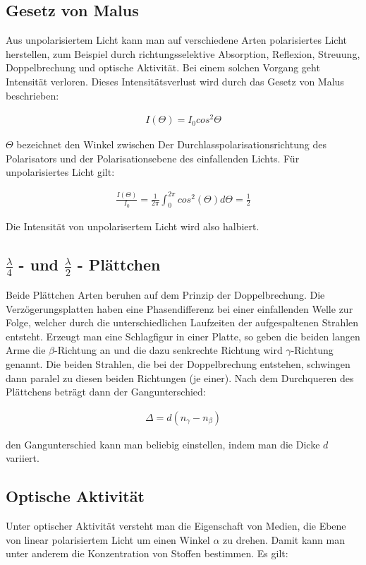 \documentclass[a4paper,10pt]{scrartcl}
\begin{document}
		\subsection{Gesetz von Malus}
			Aus unpolarisiertem Licht kann man auf verschiedene Arten polarisiertes Licht herstellen, zum Beispiel durch richtungsselektive Absorption, Reflexion, Streuung, Doppelbrechung und optische Aktivität. Bei einem solchen Vorgang geht Intensität verloren. Dieses Intensitätsverlust wird durch das Gesetz von Malus beschrieben:
			
			\begin{align}
			I(\Theta)=I_{0}cos^{2}\Theta
			\end{align}
			
			\(\Theta\) bezeichnet den Winkel zwischen Der Durchlasspolarisationsrichtung des Polarisators und der Polarisationsebene des einfallenden Lichts. Für unpolarisiertes Licht gilt:
			
			\begin{align}
			\frac{I(\Theta)}{I_{0}}=\frac{1}{2\pi}\int_{0}^{2\pi}cos^{2}(\Theta)d\Theta=\frac{1}{2}
			\end{align}
			
			Die Intensität von unpolarisertem Licht wird also halbiert.
			
		\subsection{\(\frac{\lambda}{4}\) - und \(\frac{\lambda}{2}\) - Plättchen}
			Beide Plättchen Arten beruhen auf dem Prinzip der Doppelbrechung. Die Verzögerungsplatten haben eine Phasendifferenz bei einer einfallenden Welle zur Folge, welcher durch die unterschiedlichen Laufzeiten der aufgespaltenen Strahlen entsteht. Erzeugt man eine Schlagfigur in einer Platte, so geben die beiden langen Arme die \(\beta\)-Richtung an und die dazu senkrechte Richtung wird \(\gamma\)-Richtung genannt. Die beiden Strahlen, die bei der Doppelbrechung entstehen, schwingen dann paralel zu diesen beiden Richtungen (je einer). Nach dem Durchqueren des Plättchens beträgt dann der Gangunterschied:
			
			\begin{align}
			\Delta=d(n_{\gamma}-n_{\beta})
			\end{align}
			
			den Gangunterschied kann man beliebig einstellen, indem man die Dicke \(d\) variiert.
			
		\subsection{Optische Aktivität}
			Unter optischer Aktivität versteht man die Eigenschaft von Medien, die Ebene von linear polarisiertem Licht um einen Winkel \(\alpha\) zu drehen. Damit kann man unter anderem die Konzentration von Stoffen bestimmen. Es gilt:
			
\end{document}
